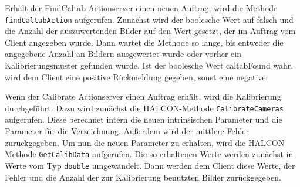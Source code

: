Erhält der FindCaltab Actionserver einen neuen Auftrag, wird die Methode \texttt{findCaltabAction} aufgerufen. Zunächst wird der boolesche Wert auf falsch und die Anzahl der auszuwertenden Bilder auf den Wert gesetzt, der im Auftrag vom Client angegeben wurde. Dann wartet die Methode so lange, bis entweder die angegebene Anzahl an Bildern ausgewertet wurde oder vorher ein Kalibrierungsmuster gefunden wurde. Ist der boolesche Wert caltabFound wahr, wird dem Client eine positive Rückmeldung gegeben, sonst eine negative.

Wenn der Calibrate Actionserver einen Auftrag erhält, wird die Kalibrierung durchgeführt. Dazu wird zunächst die HALCON-Methode \texttt{CalibrateCameras} aufgerufen. Diese berechnet intern die neuen intrinsischen Parameter und die Parameter für die Verzeichnung. Außerdem wird der mittlere Fehler zurückgegeben. Um nun die neuen Parameter zu erhalten, wird die HALCON-Methode \texttt{GetCalibData} aufgerufen. Die so erhaltenen Werte werden zunächst in Werte vom Typ \texttt{double} umgewandelt. Dann werden dem Client diese Werte, der Fehler und die Anzahl der zur Kalibrierung benutzten Bilder zurückgegeben.

